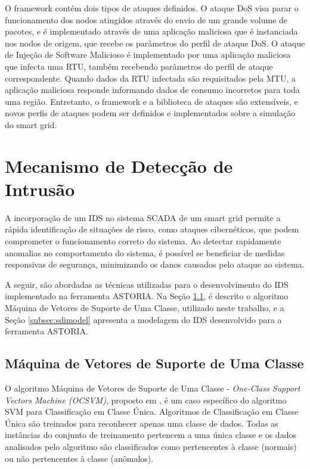 \documentclass[cic,tc]{iiufrgs}
\begin{document}
O framework contém dois tipos de ataques definidos. O ataque DoS visa parar o funcionamento dos nodos atingidos através do envio de um grande volume de pacotes, e é implementado através de uma aplicação maliciosa que é instanciada nos nodos de origem, que recebe os parâmetros do perfil de ataque DoS. O ataque de Injeção de Software Malicioso é implementado por uma aplicação maliciosa que infecta uma RTU, também recebendo parâmetros do perfil de ataque correspondente. Quando dados da RTU infectada são requisitados pela MTU, a aplicação maliciosa responde informando dados de consumo incorretos para toda uma região. Entretanto, o framework e a biblioteca de ataques são extensíveis, e novos perfis de ataques podem ser definidos e implementados sobre a simulação do smart grid.
 
\section{Mecanismo de Detecção de Intrusão}
\label{secsdi}

A incorporação de um IDS no sistema SCADA de um smart grid permite a rápida identificação de situações de risco, como ataques cibernéticos, que podem comprometer o funcionamento correto do sistema. Ao detectar rapidamente anomalias no comportamento do sistema, é possível se beneficiar de medidas responsivas de segurança, minimizando os danos causados pelo ataque ao sistema. 

A seguir, são abordadas as técnicas utilizadas para o desenvolvimento do IDS implementado na ferramenta ASTORIA. Na Seção \ref{subsec:ocsvm}, é descrito o algoritmo Máquina de Vetores de Suporte de Uma Classe, utilizado neste trabalho, e a Seção \ref{subsec:sdimodel} apresenta a modelagem do IDS desenvolvido para a ferramenta ASTORIA.

\subsection{Máquina de Vetores de Suporte de Uma Classe}
\label{subsec:ocsvm}

O algoritmo Máquina de Vetores de Suporte de Uma Classe - \emph{One-Class Support Vectors Machine (OCSVM)}, proposto em \cite{scholkopf2001svm}, é um caso específico do algoritmo SVM para Classificação em Classe Única. Algoritmos de Classificação em Classe Única são treinados para reconhecer apenas uma classe de dados. Todas as instâncias do conjunto de treinamento pertencem a uma única classe e os dados analisados pelo algoritmo são classificados como pertencentes à classe (normais) ou não pertencentes à classe (anômalos).
\end{document}
